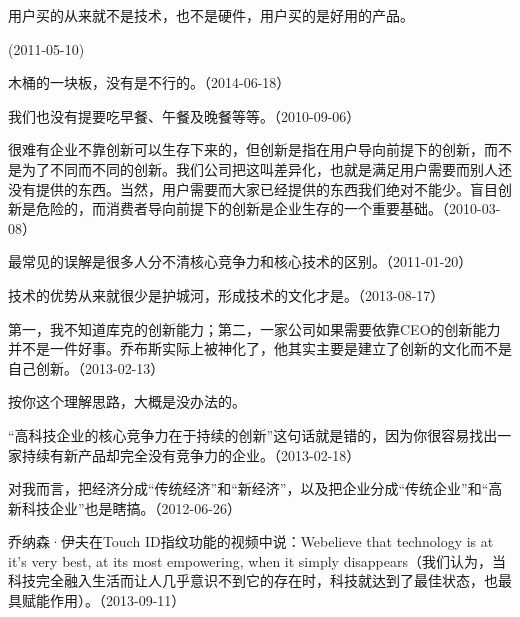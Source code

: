 用户买的从来就不是技术，也不是硬件，用户买的是好用的产品。

(2011-05-10)


木桶的一块板，没有是不行的。（2014-06-18）


我们也没有提要吃早餐、午餐及晚餐等等。（2010-09-06）

很难有企业不靠创新可以生存下来的，但创新是指在用户导向前提下的创新，而不是为了不同而不同的创新。我们公司把这叫差异化，也就是满足用户需要而别人还没有提供的东西。当然，用户需要而大家已经提供的东西我们绝对不能少。盲目创新是危险的，而消费者导向前提下的创新是企业生存的一个重要基础。（2010-03-08）


最常见的误解是很多人分不清核心竞争力和核心技术的区别。（2011-01-20）

技术的优势从来就很少是护城河，形成技术的文化才是。（2013-08-17）


第一，我不知道库克的创新能力；第二，一家公司如果需要依靠CEO的创新能力并不是一件好事。乔布斯实际上被神化了，他其实主要是建立了创新的文化而不是自己创新。（2013-02-13）


按你这个理解思路，大概是没办法的。

“高科技企业的核心竞争力在于持续的创新”这句话就是错的，因为你很容易找出一家持续有新产品却完全没有竞争力的企业。（2013-02-18）

对我而言，把经济分成“传统经济”和“新经济”，以及把企业分成“传统企业”和“高新科技企业”也是瞎搞。（2012-06-26）


乔纳森·伊夫在Touch ID指纹功能的视频中说：Webelieve that technology is at it's very best, at its most empowering, when it simply disappears（我们认为，当科技完全融入生活而让人几乎意识不到它的存在时，科技就达到了最佳状态，也最具赋能作用）。（2013-09-11）

